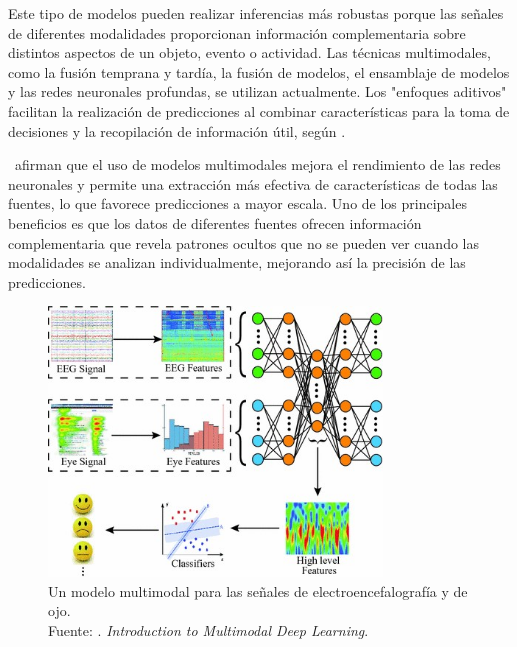 Este tipo de modelos pueden realizar inferencias más robustas porque las señales de diferentes modalidades proporcionan información complementaria sobre distintos aspectos de un objeto, evento o actividad. Las técnicas multimodales, como la fusión temprana y tardía, la fusión de modelos, el ensamblaje de modelos y las redes neuronales profundas, se utilizan actualmente. Los "enfoques aditivos" facilitan la realización de predicciones al combinar características para la toma de decisiones y la recopilación de información útil, según \parencite{tec_liu2018multideeplearning}.

\cite{tec_baheti2020introduction_mdl} afirman que el uso de modelos multimodales mejora el rendimiento de las redes neuronales y permite una extracción más efectiva de características de todas las fuentes, lo que favorece predicciones a mayor escala. Uno de los principales beneficios es que los datos de diferentes fuentes ofrecen información complementaria que revela patrones ocultos que no se pueden ver cuando las modalidades se analizan individualmente, mejorando así la precisión de las predicciones.

\begin{figure}[!ht]
	\begin{center}
		\includegraphics[width=0.79\textwidth]{2/figures/multimodal_deep_learning_example.jpg}
		\caption[Un modelo multimodal para las señales de electroencefalografía y de ojo]{Un modelo multimodal para las señales de electroencefalografía y de ojo.\\
		Fuente: \cite{tec_baheti2020introduction_mdl}. \textit{Introduction to Multimodal Deep Learning}.}
		\label{2:fig7}
	\end{center}
\end{figure}

